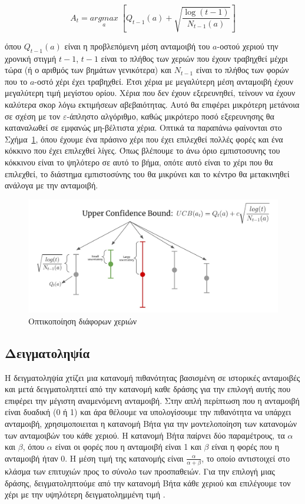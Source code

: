 \begin{equation}
    A_t = \underset{a}{argmax}\;\left[Q_{t-1}(a) + \sqrt{\frac{\log{(t-1)}}{N_{t-1}(a)}}\right]
\end{equation}

όπου $Q_{t-1}(a)$ είναι η προβλεπόμενη μέση ανταμοιβή του $a$-οστού χεριού την χρονική στιγμή $t-1$, $t-1$ είναι το πλήθος των χεριών που έχουν τραβηχθεί μέχρι τώρα (ή ο αριθμός των βημάτων γενικότερα) και $N_{t-1}$ είναι το πλήθος των φορών που το $a$-οστό χέρι έχει τραβηχθεί. Έτσι χέρια με μεγαλύτερη μέση ανταμοιβή έχουν μεγαλύτερη τιμή μεγίστου ορίου. Χέρια που δεν έχουν εξερευνηθεί, τείνουν να έχουν καλύτερα σκορ λόγω εκτιμήσεων αβεβαιότητας. Αυτό θα επιφέρει μικρότερη μετάνοια σε σχέση με τον $ε$-άπληστο αλγόριθμο, καθώς μικρότερο ποσό εξερευνησης θα καταναλωθεί σε εμφανώς μη-βέλτιστα χέρια. Οπτικά τα παραπάνω φαίνονται στο Σχήμα~\ref{fig:ucb}, όπου έχουμε ένα πράσινο χέρι που έχει επιλεχθεί πολλές φορές και ένα κόκκινο που έχει επιλεχθεί λίγες. Όπως βλέπουμε το άνω όριο εμπιστοσυνης του κόκκινου είναι το ψηλότερο σε αυτό το βήμα, οπότε αυτό είναι το χέρι που θα επιλεχθεί, το διάστημα εμπιστοσύνης του θα μικρύνει και το κέντρο θα μετακινηθεί ανάλογα με την ανταμοιβή.

\begin{figure}
    \centering
    \includegraphics[width=\textwidth]{body_matter/bandits/images/ucb.jpg}
    \caption{Οπτικοποίηση  \cite{yan2022bandit} διάφορων χεριών}
    \label{fig:ucb}
\end{figure}

\subsection{Δειγματοληψία }

Η δειγματοληψία  χτίζει μια κατανομή πιθανότητας βασισμένη σε ιστορικές ανταμοιβές και μετά δειγματοληπτεί από την κατανομή καθε δράσης για την επιλογή αυτής που επιφέρει την μέγιστη αναμενόμενη ανταμοιβή. Στην απλή περίπτωση που η ανταμοιβή είναι δυαδική (0 ή 1) και άρα θέλουμε να υπολογίσουμε την πιθανότητα να υπάρχει ανταμοιβή, χρησιμοποιειται η κατανομή Βήτα για την μοντελοποίηση των κατανομών των ανταμοιβών του κάθε χεριού. Η κατανομή Βήτα παίρνει δύο παραμέτρους, τα $α$ και $β$, όπου $α$ είναι οι φορές που η ανταμοιβή είναι 1 και $β$ είναι η φορές που η ανταμοιβή ήταν $0$. Η μέση τιμή της κατανομής είναι $\frac{α}{α+β}$, το οποίο αντιστοιχεί στο κλάσμα των επιτυχιών προς το σύνολο των προσπαθειών. Για την επιλογή μιας δράσης, δειγματοληπτούμε από την κατανομή Βήτα κάθε χεριού και επιλέγουμε τον χέρι με την υψηλότερη δειγματολημμένη τιμή \cite{thompsonsampling}.

